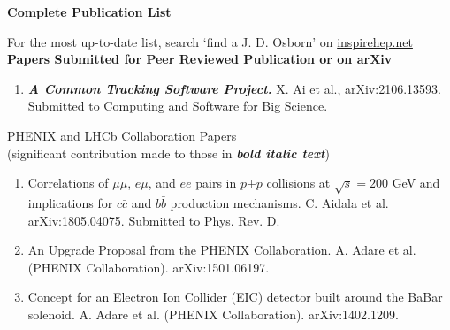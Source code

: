 \documentclass[11pt]{article}
\begin{document}
%
%
%

\newpage




\cleardoublepage

\begin{flushleft}

\huge\textbf{Complete Publication List}
\vspace{0.5cm}

{\large For the most up-to-date list, search `find a J. D. Osborn' on \href{inspirehep.net}{inspirehep.net} \\}
\vspace{0.5cm}
\Large\textbf{Papers Submitted for Peer Reviewed Publication or on arXiv} \\
\normalsize
\begin{center}
	\begin{flushleft}
	
	\begin{enumerate}
		
		\item {\textbf{\textit{A Common Tracking Software Project.}}} X. Ai et al., arXiv:2106.13593. Submitted to Computing and Software for Big Science.
	\end{enumerate}
	
	\vspace{0.7cm}
	\large PHENIX and LHCb Collaboration Papers\\ (significant contribution made to those in \textbf{\textit{bold italic text}}) \\
	\end{flushleft}
	\begin{enumerate}

			
		\item Correlations of $\mu\mu$, $e\mu$, and $ee$ pairs in $p$$+$$p$ collisions at $\sqrt{s}=200$ GeV and implications for $c\bar{c}$ and $b\bar{b}$ production mechanisms. C. Aidala et al. arXiv:1805.04075. Submitted to Phys. Rev. D.
		\item An Upgrade Proposal from the PHENIX Collaboration. A. Adare et al. (PHENIX Collaboration). arXiv:1501.06197.
		\item Concept for an Electron Ion Collider (EIC) detector built around the BaBar solenoid. A. Adare et al. (PHENIX Collaboration). arXiv:1402.1209.
		
\end{enumerate}
	
\end{center}


\end{flushleft}
\end{document}

